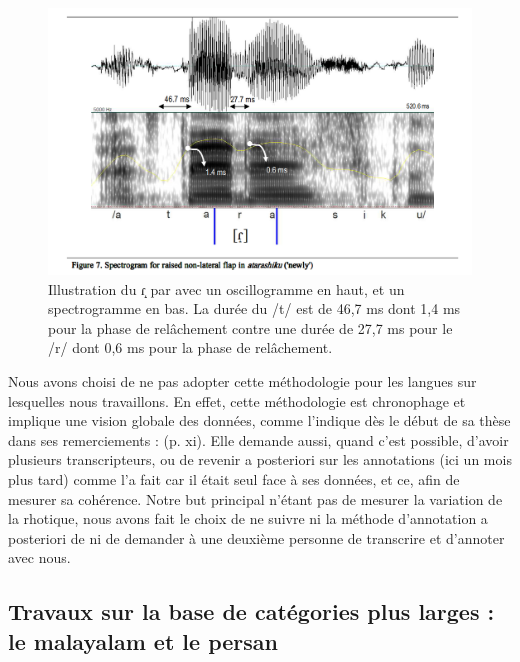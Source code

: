\begin{figure}
	\centering
	\includegraphics[width=0.8\linewidth]{substance/images/figure7_magnuson}
	\caption[Illustration du  ɾ̝  par \textcite{magnusonWhatSoundsKansai2008}]{Illustration du  ɾ̝  par \textcite[p.61]{magnusonWhatSoundsKansai2008} avec un oscillogramme en haut, et un spectrogramme en bas. La durée du /t/ est de 46,7 ms dont 1,4 ms pour la phase de relâchement contre une durée de 27,7 ms pour le /r/ dont 0,6 ms pour la phase de relâchement.}
	\label{fig:figure7magnuson}
\end{figure}

Nous avons choisi de ne pas adopter cette méthodologie pour les langues sur lesquelles nous travaillons. En effet, cette méthodologie est chronophage et implique une vision globale des données, comme \citeauthor{sebregtsSociophoneticsPhonologyDutch2014} l'indique dès le début de sa thèse dans ses remerciements :  (p. xi). Elle demande aussi, quand c'est possible, d'avoir plusieurs transcripteurs, ou de revenir a posteriori sur les annotations (ici un mois plus tard) comme \textcite{magnusonWhatSoundsKansai2008} l'a fait car il était seul face à ses données, et ce, afin de mesurer sa cohérence. Notre but principal n'étant pas de mesurer la variation de la rhotique, nous avons fait le choix de ne suivre ni la méthode d'annotation a posteriori de \textcite{magnusonWhatSoundsKansai2008} ni de demander à une deuxième personne de transcrire et d'annoter avec nous.


\subsection{Travaux sur la base de catégories plus larges : le malayalam et le persan}

